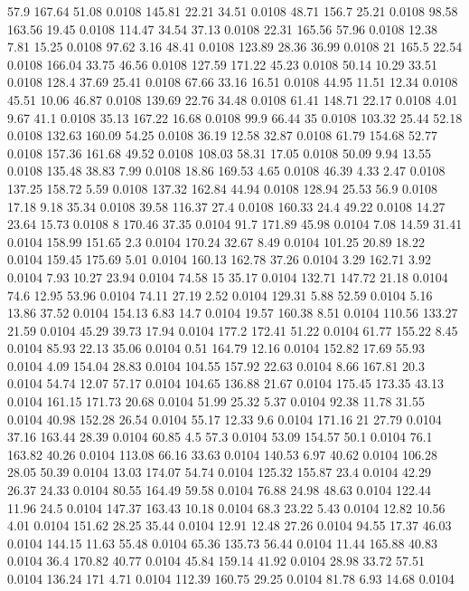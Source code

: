 57.9	167.64	51.08	0.0108
145.81	22.21	34.51	0.0108
48.71	156.7	25.21	0.0108
98.58	163.56	19.45	0.0108
114.47	34.54	37.13	0.0108
22.31	165.56	57.96	0.0108
12.38	7.81	15.25	0.0108
97.62	3.16	48.41	0.0108
123.89	28.36	36.99	0.0108
21	165.5	22.54	0.0108
166.04	33.75	46.56	0.0108
127.59	171.22	45.23	0.0108
50.14	10.29	33.51	0.0108
128.4	37.69	25.41	0.0108
67.66	33.16	16.51	0.0108
44.95	11.51	12.34	0.0108
45.51	10.06	46.87	0.0108
139.69	22.76	34.48	0.0108
61.41	148.71	22.17	0.0108
4.01	9.67	41.1	0.0108
35.13	167.22	16.68	0.0108
99.9	66.44	35	0.0108
103.32	25.44	52.18	0.0108
132.63	160.09	54.25	0.0108
36.19	12.58	32.87	0.0108
61.79	154.68	52.77	0.0108
157.36	161.68	49.52	0.0108
108.03	58.31	17.05	0.0108
50.09	9.94	13.55	0.0108
135.48	38.83	7.99	0.0108
18.86	169.53	4.65	0.0108
46.39	4.33	2.47	0.0108
137.25	158.72	5.59	0.0108
137.32	162.84	44.94	0.0108
128.94	25.53	56.9	0.0108
17.18	9.18	35.34	0.0108
39.58	116.37	27.4	0.0108
160.33	24.4	49.22	0.0108
14.27	23.64	15.73	0.0108
8	170.46	37.35	0.0104
91.7	171.89	45.98	0.0104
7.08	14.59	31.41	0.0104
158.99	151.65	2.3	0.0104
170.24	32.67	8.49	0.0104
101.25	20.89	18.22	0.0104
159.45	175.69	5.01	0.0104
160.13	162.78	37.26	0.0104
3.29	162.71	3.92	0.0104
7.93	10.27	23.94	0.0104
74.58	15	35.17	0.0104
132.71	147.72	21.18	0.0104
74.6	12.95	53.96	0.0104
74.11	27.19	2.52	0.0104
129.31	5.88	52.59	0.0104
5.16	13.86	37.52	0.0104
154.13	6.83	14.7	0.0104
19.57	160.38	8.51	0.0104
110.56	133.27	21.59	0.0104
45.29	39.73	17.94	0.0104
177.2	172.41	51.22	0.0104
61.77	155.22	8.45	0.0104
85.93	22.13	35.06	0.0104
0.51	164.79	12.16	0.0104
152.82	17.69	55.93	0.0104
4.09	154.04	28.83	0.0104
104.55	157.92	22.63	0.0104
8.66	167.81	20.3	0.0104
54.74	12.07	57.17	0.0104
104.65	136.88	21.67	0.0104
175.45	173.35	43.13	0.0104
161.15	171.73	20.68	0.0104
51.99	25.32	5.37	0.0104
92.38	11.78	31.55	0.0104
40.98	152.28	26.54	0.0104
55.17	12.33	9.6	0.0104
171.16	21	27.79	0.0104
37.16	163.44	28.39	0.0104
60.85	4.5	57.3	0.0104
53.09	154.57	50.1	0.0104
76.1	163.82	40.26	0.0104
113.08	66.16	33.63	0.0104
140.53	6.97	40.62	0.0104
106.28	28.05	50.39	0.0104
13.03	174.07	54.74	0.0104
125.32	155.87	23.4	0.0104
42.29	26.37	24.33	0.0104
80.55	164.49	59.58	0.0104
76.88	24.98	48.63	0.0104
122.44	11.96	24.5	0.0104
147.37	163.43	10.18	0.0104
68.3	23.22	5.43	0.0104
12.82	10.56	4.01	0.0104
151.62	28.25	35.44	0.0104
12.91	12.48	27.26	0.0104
94.55	17.37	46.03	0.0104
144.15	11.63	55.48	0.0104
65.36	135.73	56.44	0.0104
11.44	165.88	40.83	0.0104
36.4	170.82	40.77	0.0104
45.84	159.14	41.92	0.0104
28.98	33.72	57.51	0.0104
136.24	171	4.71	0.0104
112.39	160.75	29.25	0.0104
81.78	6.93	14.68	0.0104
